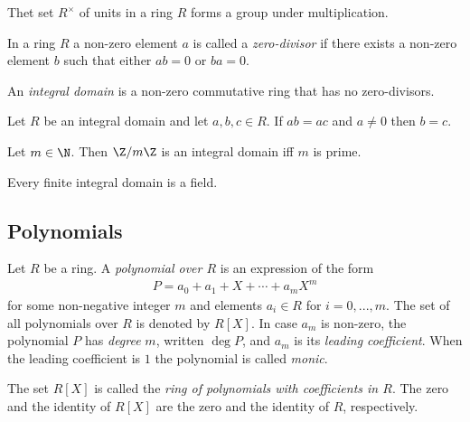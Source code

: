 \documentclass{article}
\begin{document}
\begin{proposition}
    Thet set $R^\times$ of units in a ring $R$ forms a group under multiplication.
\end{proposition}

\begin{definition}
    In a ring $R$ a non-zero element $a$ is called a \emph{zero-divisor} if 
    there exists a non-zero element $b$ such that either $ab=0$ or $ba=0$.
\end{definition}

\begin{definition}
    An \emph{integral domain} is a non-zero commutative ring that has no zero-divisors.
\end{definition}

\begin{proposition}[Notes 3.2.15]
    Let $R$ be an integral domain and let $a,b,c\in R$. If $ab=ac$ and $a\not=0$
    then $b=c$.
\end{proposition}

\begin{proposition}[Notes 3.2.16]
    Let $m\in\N$. Then $\Z/m\Z$ is an integral domain iff $m$ is prime. 
\end{proposition}

\begin{theorem}[Notes 3.2.17]
    Every finite integral domain is a field.
\end{theorem}

\subsection{Polynomials}

\begin{definition}
    Let $R$ be a ring. A \emph{polynomial over $R$} is an expression of the form 
    \begin{align*}
        P=a_0+a_1+X+\cdots+a_mX^m
    \end{align*} 
    for some non-negative integer $m$ and elements $a_i\in R$ for $i=0,...,m$.
    The set of all polynomials over $R$ is denoted by $R[X]$. In case $a_m$ 
    is non-zero, the polynomial $P$ has \emph{degree} $m$, written $\deg P$,
    and $a_m$ is its \emph{leading coefficient}. When the leading coefficient is 
    $1$ the polynomial is called \emph{monic}.
\end{definition}

\begin{definition}
    The set $R[X]$ is called the \emph{ring of polynomials with coefficients 
    in $R$}. The zero and the identity of $R[X]$ are the zero and the identity of 
    $R$, respectively.
\end{definition}
\end{document}
